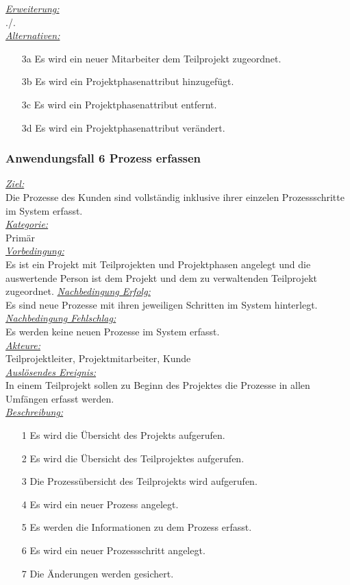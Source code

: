 \underline{\emph{Erweiterung:}} \\
./.\\
\underline{\emph{Alternativen:}} \\
\begin{itemize}
    \item [3a] Es wird ein neuer Mitarbeiter dem Teilprojekt zugeordnet.
    \item [3b] Es wird ein Projektphasenattribut hinzugefügt. 
    \item [3c] Es wird ein Projektphasenattribut entfernt.
    \item [3d] Es wird ein Projektphasenattribut verändert.
\end{itemize}

\subsubsection{Anwendungsfall 6 Prozess erfassen}
\underline{\emph{Ziel:}}\\
Die Prozesse des Kunden sind vollständig inklusive ihrer einzelen Prozessschritte im System erfasst.\\
\underline{\emph{Kategorie:}} \\
Primär\\
\underline{\emph{Vorbedingung:}} \\
Es ist ein Projekt mit Teilprojekten und Projektphasen angelegt und die auswertende Person ist dem Projekt und dem zu verwaltenden Teilprojekt zugeordnet.
\underline{\emph{Nachbedingung Erfolg:}} \\
Es sind neue Prozesse mit ihren jeweiligen Schritten im System hinterlegt.\\
\underline{\emph{Nachbedingung Fehlschlag:}} \\
Es werden keine neuen Prozesse im System erfasst.\\
\underline{\emph{Akteure:}} \\
Teilprojektleiter, Projektmitarbeiter, Kunde\\
\underline{\emph{Auslösendes Ereignis:}} \\
In einem Teilprojekt sollen zu Beginn des Projektes die Prozesse in allen Umfängen erfasst werden.\\
\underline{\emph{Beschreibung:}}
\begin{itemize}
    \item [1] Es wird die Übersicht des Projekts aufgerufen.
    \item [2] Es wird die Übersicht des Teilprojektes aufgerufen.
    \item [3] Die Prozessübersicht des Teilprojekts wird aufgerufen.
    \item [4] Es wird ein neuer Prozess angelegt.
    \item [5] Es werden die Informationen zu dem Prozess erfasst.
    \item [6] Es wird ein neuer Prozessschritt angelegt.
    \item [7] Die Änderungen werden gesichert.
\end{itemize}

